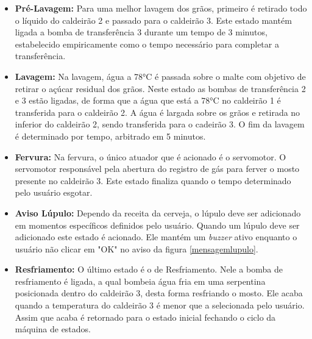 \begin{itemize}
	   \item \textbf{Pré-Lavagem:} Para uma melhor lavagem dos grãos, primeiro é retirado todo o líquido do caldeirão 2 e passado para o caldeirão 3. Este estado mantém ligada a bomba de transferência 3 durante um tempo de 3 minutos, estabelecido empiricamente como o tempo necessário para completar a transferência.
\end{itemize}

\begin{itemize}
	   \item \textbf{Lavagem:} Na lavagem, água a 78°C é passada sobre o malte com objetivo de retirar o açúcar residual dos grãos. Neste estado as bombas de transferência 2 e 3 estão ligadas, de forma que a água que está a 78°C no caldeirão 1 é transferida para o caldeirão 2. A água é largada sobre os grãos e retirada no inferior do caldeirão 2, sendo transferida para o cadeirão 3. O fim da lavagem é determinado por tempo, arbitrado em 5 minutos. 
\end{itemize}

\begin{itemize}
	   \item \textbf{Fervura:} Na fervura, o único atuador que é acionado é o servomotor. O servomotor responsável pela abertura do registro de gás para ferver o mosto presente no caldeirão 3. Este estado finaliza quando o tempo determinado pelo usuário esgotar. 
\end{itemize}

\begin{itemize}
	   \item \textbf{Aviso Lúpulo:} Dependo da receita da cerveja, o lúpulo deve ser adicionado em momentos específicos definidos pelo usuário. Quando um lúpulo deve ser adicionado este estado é acionado. Ele mantém um \textit{buzzer} ativo enquanto o usuário não clicar em "OK" no aviso da figura \ref{mensagemlupulo}.
\end{itemize}

\begin{itemize}
	   \item \textbf{Resfriamento:} O último estado é o de Resfriamento. Nele a bomba de resfriamento é ligada, a qual bombeia água fria em uma serpentina posicionada dentro do caldeirão 3, desta forma resfriando o mosto. Ele acaba quando a temperatura do caldeirão 3 é menor que a selecionada pelo usuário. Assim que acaba é retornado para o estado inicial fechando o ciclo da máquina de estados.  
\end{itemize}





